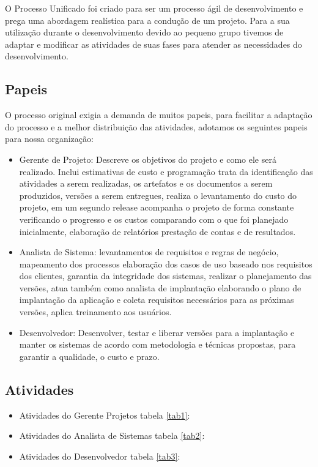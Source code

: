 \documentclass[	DIV=calc,%
							paper=a4,%
							fontsize=12pt,%
							onecolumn]{scrartcl}	 					%
\begin{document}
O Processo Unificado foi criado para ser um processo ágil de desenvolvimento e prega uma abordagem realística para a condução de um projeto. Para a sua utilização durante o desenvolvimento devido ao pequeno grupo tivemos de adaptar e modificar as atividades de suas fases para atender as necessidades do desenvolvimento.

\subsection{Papeis}

O processo original exigia a demanda de muitos papeis, para facilitar a adaptação do processo e a melhor distribuição das atividades, adotamos os seguintes papeis para nossa organização:

\begin{itemize}

	\item Gerente de Projeto: Descreve os objetivos do projeto e como ele será realizado. Inclui estimativas de custo e programação trata da identificação das atividades a serem realizadas, os artefatos e os documentos a serem produzidos, versões a serem entregues, realiza o levantamento do custo do projeto, em um segundo release acompanha o projeto de forma constante verificando o progresso e os custos  comparando com o que foi planejado inicialmente, elaboração de relatórios prestação de contas e de resultados.

	\item Analista de Sistema: levantamentos de requisitos e regras de negócio, mapeamento dos processos elaboração dos casos de uso baseado nos requisitos dos clientes, garantia da integridade dos sistemas, realizar o planejamento das versões, atua também como analista de implantação elaborando o plano de implantação da aplicação e coleta requisitos necessários para as próximas versões, aplica treinamento aos usuários.

	\item Desenvolvedor: Desenvolver, testar e liberar versões para a implantação e manter os sistemas de acordo com metodologia e técnicas propostas, para garantir a qualidade, o custo e prazo.
\end{itemize} 
\subsection{Atividades}
\begin{itemize}
    

\item Atividades do Gerente Projetos tabela \ref{tab1}:


\item Atividades do Analista de Sistemas tabela \ref{tab2}:


\item Atividades do Desenvolvedor tabela \ref{tab3}:


\end{itemize}
\end{document}
